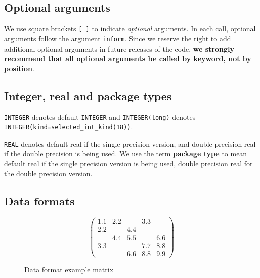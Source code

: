 \documentclass{spral}
\begin{document}
\subsection{Optional arguments}\label{Optional arguments}

We use square brackets {\tt [ ]} to indicate {\it optional} arguments.
In each
call, optional arguments follow the argument {\tt inform}.  Since we
reserve the right to add additional optional arguments in future
releases of the code, {\bf we strongly recommend that all optional
arguments be called by keyword, not by position}.

\subsection{Integer, real and package types}\label{Integer kinds}

{\tt INTEGER} denotes default {\tt INTEGER} and
{\tt INTEGER(long)} denotes {\tt INTEGER(kind=selected\_int\_kind(18))}.

\noindent
{\tt REAL} denotes default real if the single precision version, and double
precision real if the double precision is being used.
We use the term {\bf package type} to mean
default real if the single precision version is being used,
double precision real for the double precision version.

\subsection{Data formats} \label{dataformats}

\begin{figure}
   \caption{ \label{format eg}
      Data format example matrix
   }
   $$
      \left( \begin{array}{ccccc}
         1.1 & 2.2 &     & 3.3 &     \\
         2.2 &     & 4.4 &     &     \\
             & 4.4 & 5.5 &     & 6.6 \\
         3.3 &     &     & 7.7 & 8.8 \\
             &     & 6.6 & 8.8 & 9.9
      \end{array} \right)
   $$
\end{figure}
\end{document}
